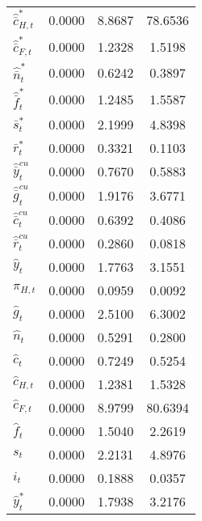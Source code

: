 \begin{center}
\begin{longtable}{lccc}
${\hat {\bar c}_{H,t}^*}  $	 & 	       0.0000	 & 	       8.8687	 & 	      78.6536 \\ 
${\hat {\bar c}_{F,t}^*}  $	 & 	       0.0000	 & 	       1.2328	 & 	       1.5198 \\ 
${\hat {\bar n}_t^*}      $	 & 	       0.0000	 & 	       0.6242	 & 	       0.3897 \\ 
${\hat {\bar f}_t^*}      $	 & 	       0.0000	 & 	       1.2485	 & 	       1.5587 \\ 
${\bar s_t^*}             $	 & 	       0.0000	 & 	       2.1999	 & 	       4.8398 \\ 
${\bar r_t^*}             $	 & 	       0.0000	 & 	       0.3321	 & 	       0.1103 \\ 
${\hat {\bar y}_t^{cu}}   $	 & 	       0.0000	 & 	       0.7670	 & 	       0.5883 \\ 
${\hat {\bar g}_t^{cu}}   $	 & 	       0.0000	 & 	       1.9176	 & 	       3.6771 \\ 
${\hat {\bar c}_t^{cu}}   $	 & 	       0.0000	 & 	       0.6392	 & 	       0.4086 \\ 
${\hat {\bar r}_t^{cu}}   $	 & 	       0.0000	 & 	       0.2860	 & 	       0.0818 \\ 
${\hat y_t}               $	 & 	       0.0000	 & 	       1.7763	 & 	       3.1551 \\ 
${\pi_{H,t}}              $	 & 	       0.0000	 & 	       0.0959	 & 	       0.0092 \\ 
${\hat g_t}               $	 & 	       0.0000	 & 	       2.5100	 & 	       6.3002 \\ 
${\hat n_t}               $	 & 	       0.0000	 & 	       0.5291	 & 	       0.2800 \\ 
${\hat c_t}               $	 & 	       0.0000	 & 	       0.7249	 & 	       0.5254 \\ 
${\hat c_{H,t}}           $	 & 	       0.0000	 & 	       1.2381	 & 	       1.5328 \\ 
${\hat c_{F,t}}           $	 & 	       0.0000	 & 	       8.9799	 & 	      80.6394 \\ 
${\hat f_t}               $	 & 	       0.0000	 & 	       1.5040	 & 	       2.2619 \\ 
${s_t}                    $	 & 	       0.0000	 & 	       2.2131	 & 	       4.8976 \\ 
${i_t}                    $	 & 	       0.0000	 & 	       0.1888	 & 	       0.0357 \\ 
${\hat y_t^*}             $	 & 	       0.0000	 & 	       1.7938	 & 	       3.2176 \\ 

\end{longtable}
\end{center}
